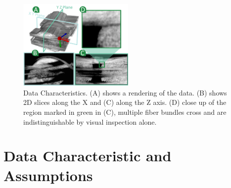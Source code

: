 \begin{figure}[tb]
\centering
\includegraphics[width=0.5\textwidth]{imagesMT2014/image1}
\caption{Data Characteristics. (A) shows a rendering of the data. (B) shows 2D slices along the X and (C) along the Z axis. (D) close up of the region marked in green in (C), multiple fiber bundles cross and are indistinguishable by visual inspection alone. }
\label{fig:data-char}
\end{figure}
\section {Data Characteristic and Assumptions}
\label{sec:char_data}

